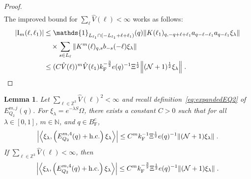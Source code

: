 \documentclass[12pt,a4paper]{article}
\numberwithin{equation}{section}
\newcommand{\NNN}{\mathbb{N}}
\newcommand{\1}{\mathbb{I}}
\newcommand{\F}{\mathrm{F}}
\newcommand{\I}{\mathrm{I}}
\newcommand{\Zstar}{\mathbb{Z}^3} %
\newcommand{\Z}{\mathbb{Z}}
\newcommand{\NN}{\mathcal{N}}
\newcommand{\half}{\frac{1}{2}}
\newcommand{\eva}[1]{\left\langle #1 \right\rangle}
\theoremstyle{plain}
\newtheorem{lemma}[theorem]{Lemma}
\theoremstyle{definition}
\theoremstyle{remark}
\theoremstyle{plain}
\theoremstyle{definition}
\theoremstyle{remark}
\begin{document}
\begin{proof}
\begin{align}
\end{align}
The improved bound for $ \sum_\ell \hat{V}(\ell) < \infty $ works as follows:
\begin{align}
	|\I_m(\ell, \ell_1)|
	&\leq \mathds{1}_{L_{\ell_1} \cap (-L_{\ell_1} + \ell + \ell_1)}(q) \norm{K(\ell_1)_{q,-q+\ell+\ell_1} a_{q-\ell-\ell_1} a_{q-\ell_1} \xi_\lambda}  \label{eq:estEQ2153} \\
	& \quad \times
		\sum_{ s \in L_{\ell}}
		\norm{ K^m(\ell)_{q,s} b_{-s}(-\ell) \xi_\lambda }\nonumber\\
	&\leq (C \hat{V}(\ell))^m
		\hat{V}(\ell_1)
		k_{\F}^{-\frac 32} e(q)^{-1} \Xi^\half
		\norm{(\NN+1)^\half\xi_\lambda} \;. \qedhere \nonumber
\end{align}
\end{proof}


\begin{lemma} \label{lem:EQ217}
Let $ \sum_{\ell \in \Zstar} \hat{V}(\ell)^2 < \infty $ and recall definition~\eqref{eq:expandedEQ2} of $ E_{Q_2}^{m,j}(q) $. For $\xi_\lambda = e^{-\lambda S} \Omega$, there exists a constant $ C > 0 $ such that for all $ \lambda \in [0,1] $, $ m \in \NNN $, and $ q \in B_{\F}^c $,
\begin{align}
	\abs{\eva{\xi_\lambda,\left(E^{m,4}_{Q_2}(q) + \mathrm{h.c.}\right) \xi_\lambda }}
	\leq C^m k_{\F}^{-1} \Xi^{\half}  e(q)^{-1} 
		\norm{(\NN+1) \xi_\lambda } \;. \label{eq:estEQ217_Coulomb}
\end{align}
If $ \sum_{\ell \in \Zstar} \hat{V}(\ell) < \infty $, then
\begin{align}
	\abs{\eva{\xi_\lambda,\left(E^{m,4}_{Q_2}(q) + \mathrm{h.c.}\right) \xi_\lambda }}
	\leq C^m k_{\F}^{-\frac 32} \Xi^{\half}  e(q)^{-1} 
		\norm{(\NN+1) \xi_\lambda } \;. \label{eq:estEQ217}
\end{align}
\end{lemma}
\end{document}

